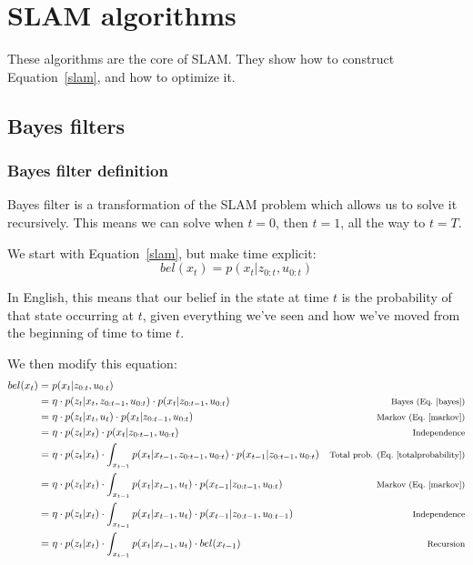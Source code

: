 \documentclass{article}
\newcommand{\alignnote}[1]{\text{\footnotesize{#1}}}
\begin{document}
\section{SLAM algorithms}

These algorithms are the core of SLAM\@. They show how to construct
Equation~\ref{slam}, and how to optimize it.

\subsection{Bayes filters}

\subsubsection{Bayes filter definition}

Bayes filter is a transformation of the SLAM problem which allows us to solve
it recursively. This means we can solve when $t=0$, then $t=1$, all the way to
$t=T$.

We start with Equation~\ref{slam}, but make time explicit:
\begin{equation}
  bel(x_t) = p(x_t \vert z_{0:t}, u_{0:t})
\end{equation}

In English, this means that our belief in the state at time $t$ is the
probability of that state occurring at $t$, given everything we've seen and how
we've moved from the beginning of time to time $t$.

We then modify this equation:
\begin{align*}
  bel(x_t) &= p(x_t \vert z_{0:t}, u_{0:t}) \\
  &= \eta \cdot
    p(z_t \vert x_t, z_{0:t-1}, u_{0:t}) \cdot
    p(x_t \vert z_{0:t-1}, u_{0:t})
           & \alignnote{Bayes (Eq.~\ref{bayes})} \\
  &= \eta \cdot
    p(z_t \vert x_t, u_t) \cdot
    p(x_t \vert z_{0:t-1}, u_{0:t})
           & \alignnote{Markov (Eq.~\ref{markov})} \\
  &= \eta \cdot
    p(z_t \vert x_t) \cdot
    p(x_t \vert z_{0:t-1}, u_{0:t})
           & \alignnote{Independence} \\
  &= \eta \cdot
    p(z_t \vert x_t) \cdot
    \int_{x_{t-1}}
      p(x_t \vert x_{t-1}, z_{0:t-1}, u_{0:t}) \cdot
      p(x_{t-1} \vert z_{0:t-1}, u_{0:t})
           & \alignnote{Total prob. (Eq.~\ref{totalprobability})} \\
  &= \eta \cdot
    p(z_t \vert x_t) \cdot
    \int_{x_{t-1}}
      p(x_t \vert x_{t-1}, u_{t}) \cdot
      p(x_{t-1} \vert z_{0:t-1}, u_{0:t})
           & \alignnote{Markov (Eq.~\ref{markov})} \\
  &= \eta \cdot
    p(z_t \vert x_t) \cdot
    \int_{x_{t-1}}
      p(x_t \vert x_{t-1}, u_{t}) \cdot
      p(x_{t-1} \vert z_{0:t-1}, u_{0:t-1})
           & \alignnote{Independence} \\
  &= \eta \cdot
    p(z_t \vert x_t) \cdot
    \int_{x_{t-1}}
      p(x_t \vert x_{t-1}, u_{t}) \cdot bel(x_{t-1})
           & \alignnote{Recursion} \\
\end{align*}
\end{document}
